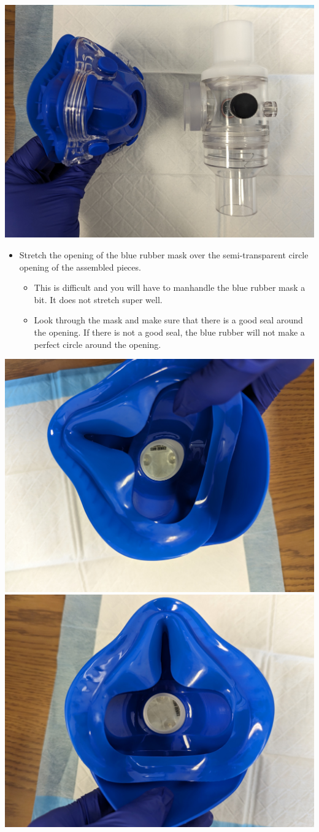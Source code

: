 \documentclass[
]{book}
\providecommand{\tightlist}{%
  \setlength{\itemsep}{0pt}\setlength{\parskip}{0pt}}
\begin{document}
\includegraphics[width=1\linewidth]{images/maskassembly/11_show_direction}

\begin{itemize}
\tightlist
\item
  Stretch the opening of the blue rubber mask over the semi-transparent circle opening of the assembled pieces.

  \begin{itemize}
  \tightlist
  \item
    This is difficult and you will have to manhandle the blue rubber mask a bit. It does not stretch super well.
  \item
    Look through the mask and make sure that there is a good seal around the opening. If there is not a good seal, the blue rubber will not make a perfect circle around the opening.
  \end{itemize}
\end{itemize}

\includegraphics[width=0.5\linewidth]{images/maskassembly/11_show_bad_seal}
\includegraphics[width=0.5\linewidth]{images/maskassembly/11_show_good_seal}
\end{document}
